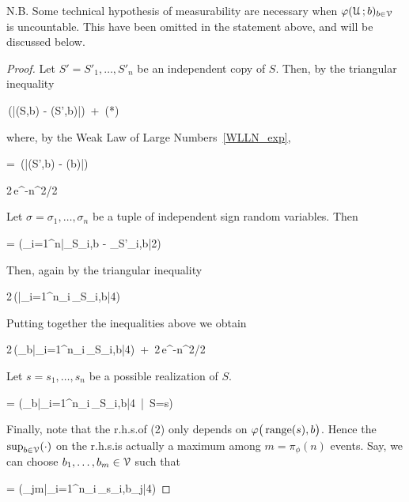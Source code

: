 \documentclass[scombinatorics.tex]{subfiles}
\begin{document}
N.B. Some technical hypothesis of measurability are necessary when $\varphi(\EuScript U\,;b)_{b\in\EuScript V}$ is uncountable. This have been omitted in the statement above, and will be discussed below.

\begin{proof}
  Let $S'=S'_1,\dots,S'_n$ be an independent copy of $S$.
  Then, by the triangular inequality

  {\le}
  {\Pr\,\bigg(\big|\Fr(S,b) - \Fr(S',b)\big|\ge\frac{}\bigg)\ +\ (*)}

  where, by the Weak Law of Large Numbers~\ref{WLLN_exp},
  
  \ceq{\hfill (*)}
  {=}
  {\Pr\,\bigg(\big|\Fr(S',b) - \Pr(b)\big|\ge\frac{}\bigg)}

  \ceq{}
  {\le}
  {2\,e^{-n\epsilon^2/2}}

  Let $\sigma=\sigma_1,\dots,\sigma_n$ be a tuple of independent sign random variables.
  Then
  
  {=}
  {\Pr\bigg(\sum_{i=1}^n\big|\Indicator_{S_i,b} - \Indicator_{S'_i,b}\big|\ge{}2\bigg)}

  Then, again by the triangular inequality

  \ceq{}
  {\le}
  {2\,\Pr\bigg(\Big|\sum_{i=1}^n\sigma_i\,\Indicator_{S_i,b}\Big|\ge{}4\bigg)}

  Putting together the inequalities above we obtain\smallskip

  {\le}
  {2\,\Pr\bigg(\sup_{b\in\V}\Big|\sum_{i=1}^n\sigma_i\,\Indicator_{S_i,b}\Big|\ge{}4\bigg)\ +\ 2\,e^{-n\epsilon^2/2}}
  \smallskip

  Let $s=s_1,\dots,s_n$ be a possible realization of $S$.\smallskip

  {=}
  {\Pr\bigg(\sup_{b\in\V}\Big|\sum_{i=1}^n\sigma_i\,\Indicator_{S_i,b}\Big|\ge{}4\ \big|\  S=s\bigg)}
  \smallskip

  Finally, note that the r.h.s.\@ of (2) only depends on $\varphi\big(\mathop{\rm range}(s),b\big)$.
  Hence the $\sup_{b\in\EuScript V}(\cdot)$ on the r.h.s.\@ is actually a maximum among $m=\pi_\phi(n)$ events.
  Say, we can choose $b_1,\dots,b_m\in\EuScript V$ such that

  {=}
  {\Pr\bigg(\sup_{j\le m}\Big|\sum_{i=1}^n\sigma_i\,\Indicator_{s_i,b_j}\Big|\ge{}4\bigg)}


\end{proof}
\end{document}
